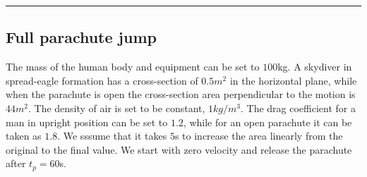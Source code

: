 \documentclass[letterpaper,10pt,english]{/usr/share/sphinx/texinputs/sphinxhowto}
\begin{document}
        
    
\begin{center}\rule{3in}{0.4pt}\end{center}

\subsection{Full parachute jump}

The mass of the human body and equipment can be set to $100$kg. A
skydiver in spread-eagle formation has a cross-section of $0.5 m^2$ in
the horizontal plane, while when the parachute is open the cross-section
area perpendicular to the motion is $44 m^2$. The density of air is set
to be constant, $1 kg/m^3$. The drag coefficient for a man in upright
position can be set to $1.2$, while for an open parachute it can be
taken as $1.8$. We sssume that it takes $5$s to increase the area
linearly from the original to the final value. We start with zero
velocity and release the parachute after $t_p=60$s.

\end{document}
